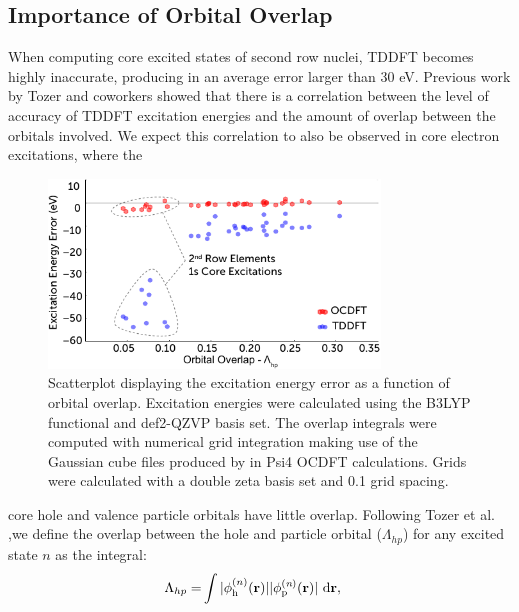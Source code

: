 \documentclass[8.5pt,twoside,twocolumn]{article}
\begin{document}
\subsection{Importance of Orbital Overlap}
When computing core excited states of second row nuclei, TDDFT becomes highly inaccurate, producing in an average error larger than 30 eV. Previous work by Tozer and coworkers \cite{peach_excitation_2008}  showed that there is a correlation between the level of accuracy of TDDFT excitation energies and the amount of overlap between the orbitals involved. We expect this correlation to also be observed in core electron excitations, where the
\begin{figure}[!t]
\centering
\includegraphics[width=8.8cm]{scatterNEWER3.pdf}
\caption{Scatterplot displaying the excitation energy error as a function of orbital overlap. Excitation energies were calculated using the B3LYP functional and def2-QZVP basis set. The overlap integrals were computed with numerical grid integration making use of the Gaussian cube files produced by in Psi4 OCDFT calculations. Grids were calculated with a double zeta basis set and 0.1 grid spacing.}
\label{figure:scatter}
\end{figure}
core hole and valence particle orbitals have little overlap. Following Tozer et al. ,\cite{peach_excitation_2008}we define the overlap between the hole and particle orbital ($\Lambda_{hp}$) for any excited state $n$ as the integral:
\begin{align}
\Lambda_{hp} = &\int |\phi^{(n)}_{\rm h} (\bf{r})||\phi^{(\textit{n})}_{\rm p} (\bf{r})| \ \rm d\bf{r} ,
\end{align}

\end{document}

